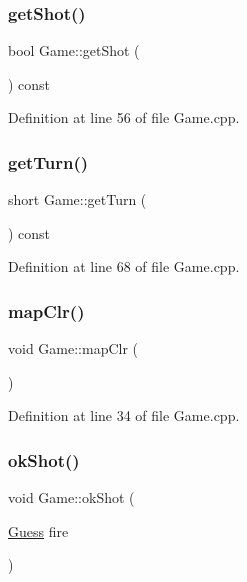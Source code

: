 \subsubsection{\texorpdfstring{get\+Shot()}{getShot()}}
{\footnotesize\ttfamily bool Game\+::get\+Shot (\begin{DoxyParamCaption}{ }\end{DoxyParamCaption}) const}



Definition at line 56 of file Game.\+cpp.

\mbox{\label{class_game_af2c2fb7e28f94dda39b88ce4f7f4eec2}} 
\subsubsection{\texorpdfstring{get\+Turn()}{getTurn()}}
{\footnotesize\ttfamily short Game\+::get\+Turn (\begin{DoxyParamCaption}{ }\end{DoxyParamCaption}) const}



Definition at line 68 of file Game.\+cpp.

\mbox{\label{class_game_a35e06b7cc99e0577418a5187b4b561ca}} 
\subsubsection{\texorpdfstring{map\+Clr()}{mapClr()}}
{\footnotesize\ttfamily void Game\+::map\+Clr (\begin{DoxyParamCaption}{ }\end{DoxyParamCaption})}



Definition at line 34 of file Game.\+cpp.

\mbox{\label{class_game_ab9025f2355418561b9e406dd4b5da02a}} 
\subsubsection{\texorpdfstring{ok\+Shot()}{okShot()}}
{\footnotesize\ttfamily void Game\+::ok\+Shot (\begin{DoxyParamCaption}\item[{\hyperlink{class_guess}{Guess}}]{fire }\end{DoxyParamCaption})}



